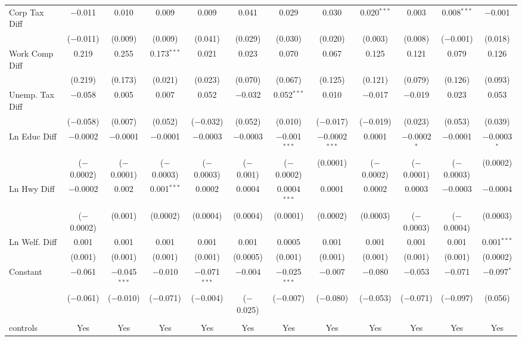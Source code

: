 \begin{table}[!htbp]
\begin{tabular}{@{\extracolsep{5pt}}lccccccccccc}
  Corp Tax Diff & $-$0.011 & 0.010 & 0.009 & 0.009 & 0.041 & 0.029 & 0.030 & 0.020$^{***}$ & 0.003 & 0.008$^{***}$ & $-$0.001 \\ 
  & ($-$0.011) & (0.009) & (0.009) & (0.041) & (0.029) & (0.030) & (0.020) & (0.003) & (0.008) & ($-$0.001) & (0.018) \\ 
  Work Comp Diff & 0.219 & 0.255 & 0.173$^{***}$ & 0.021 & 0.023 & 0.070 & 0.067 & 0.125 & 0.121 & 0.079 & 0.126 \\ 
  & (0.219) & (0.173) & (0.021) & (0.023) & (0.070) & (0.067) & (0.125) & (0.121) & (0.079) & (0.126) & (0.093) \\ 
  Unemp. Tax Diff & $-$0.058 & 0.005 & 0.007 & 0.052 & $-$0.032 & 0.052$^{***}$ & 0.010 & $-$0.017 & $-$0.019 & 0.023 & 0.053 \\ 
  & ($-$0.058) & (0.007) & (0.052) & ($-$0.032) & (0.052) & (0.010) & ($-$0.017) & ($-$0.019) & (0.023) & (0.053) & (0.039) \\ 
  Ln Educ Diff & $-$0.0002 & $-$0.0001 & $-$0.0001 & $-$0.0003 & $-$0.0003 & $-$0.001$^{***}$ & $-$0.0002$^{***}$ & 0.0001 & $-$0.0002$^{*}$ & $-$0.0001 & $-$0.0003$^{*}$ \\ 
  & ($-$0.0002) & ($-$0.0001) & ($-$0.0003) & ($-$0.0003) & ($-$0.001) & ($-$0.0002) & (0.0001) & ($-$0.0002) & ($-$0.0001) & ($-$0.0003) & (0.0002) \\ 
  Ln Hwy Diff & $-$0.0002 & 0.002 & 0.001$^{***}$ & 0.0002 & 0.0004 & 0.0004$^{***}$ & 0.0001 & 0.0002 & 0.0003 & $-$0.0003 & $-$0.0004 \\ 
  & ($-$0.0002) & (0.001) & (0.0002) & (0.0004) & (0.0004) & (0.0001) & (0.0002) & (0.0003) & ($-$0.0003) & ($-$0.0004) & (0.0003) \\ 
  Ln Welf. Diff & 0.001 & 0.001 & 0.001 & 0.001 & 0.001 & 0.0005 & 0.001 & 0.001 & 0.001 & 0.001 & 0.001$^{***}$ \\ 
  & (0.001) & (0.001) & (0.001) & (0.001) & (0.0005) & (0.001) & (0.001) & (0.001) & (0.001) & (0.001) & (0.0002) \\ 
  Constant & $-$0.061 & $-$0.045$^{***}$ & $-$0.010 & $-$0.071$^{***}$ & $-$0.004 & $-$0.025$^{***}$ & $-$0.007 & $-$0.080 & $-$0.053 & $-$0.071 & $-$0.097$^{*}$ \\ 
  & ($-$0.061) & ($-$0.010) & ($-$0.071) & ($-$0.004) & ($-$0.025) & ($-$0.007) & ($-$0.080) & ($-$0.053) & ($-$0.071) & ($-$0.097) & (0.056) \\ 
 \hline \\[-1.8ex] 
controls & Yes & Yes & Yes & Yes & Yes & Yes & Yes & Yes & Yes & Yes & Yes \\ 

\end{tabular}
\end{table}
